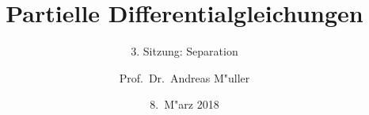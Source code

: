 \documentclass[handout]{beamer}
\title[]{Partielle Differentialgleichungen}
\subtitle{3. Sitzung: Separation}
\date[8.~M"arz 2018]{8.~M"arz 2018}
\author{Prof.~Dr.~Andreas M"uller}
\begin{document}
\begin{frame}
\titlepage

\end{frame}


\end{document}
